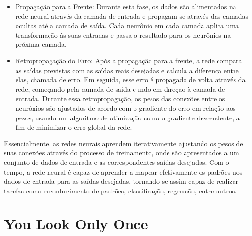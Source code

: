 \begin{itemize}
\item Propagação para a Frente: Durante esta fase, os dados são alimentados na rede neural através da camada de entrada e propagam-se através das camadas ocultas até a camada de saída. Cada neurônio em cada camada aplica uma transformação às suas entradas e passa o resultado para os neurônios na próxima camada.
\item Retropropagação do Erro: Após a propagação para a frente, a rede compara as saídas previstas com as saídas reais desejadas e calcula a diferença entre elas, chamada de erro. Em seguida, esse erro é propagado de volta através da rede, começando pela camada de saída e indo em direção à camada de entrada. Durante essa retropropagação, os pesos das conexões entre os neurônios são ajustados de acordo com o gradiente do erro em relação aos pesos, usando um algoritmo de otimização como o gradiente descendente, a fim de minimizar o erro global da rede.
\end{itemize}

Essencialmente, as redes neurais aprendem iterativamente ajustando os pesos de suas conexões através do processo de treinamento, onde são apresentados a um conjunto de dados de entrada e as correspondentes saídas desejadas. Com o tempo, a rede neural é capaz de aprender a mapear efetivamente os padrões nos dados de entrada para as saídas desejadas, tornando-se assim capaz de realizar tarefas como reconhecimento de padrões, classificação, regressão, entre outros.




\section{You Look Only Once}
\label{sec:yolo}

